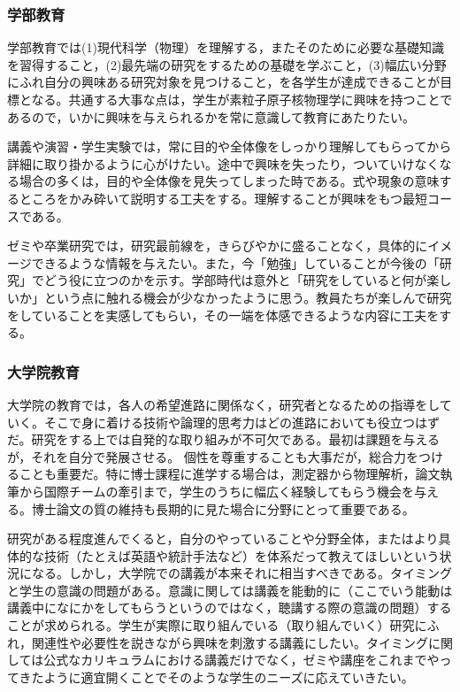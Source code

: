 \subsubsection{学部教育}
学部教育では(1)現代科学（物理）を理解する，またそのために必要な基礎知識を習得すること，(2)最先端の研究をするための基礎を学ぶこと，(3)幅広い分野にふれ自分の興味ある研究対象を見つけること，を各学生が達成できることが目標となる。共通する大事な点は，学生が素粒子原子核物理学に興味を持つことであるので，いかに興味を与えられるかを常に意識して教育にあたりたい。

講義や演習・学生実験では，常に目的や全体像をしっかり理解してもらってから詳細に取り掛かるように心がけたい。途中で興味を失ったり，ついていけなくなる場合の多くは，目的や全体像を見失ってしまった時である。式や現象の意味するところをかみ砕いて説明する工夫をする。理解することが興味をもつ最短コースである。

ゼミや卒業研究では，研究最前線を，きらびやかに盛ることなく，具体的にイメージできるような情報を与えたい。また，今「勉強」していることが今後の「研究」でどう役に立つのかを示す。学部時代は意外と「研究をしていると何が楽しいか」という点に触れる機会が少なかったように思う。教員たちが楽しんで研究をしていることを実感してもらい，その一端を体感できるような内容に工夫をする。

\subsubsection{大学院教育}

大学院の教育では，各人の希望進路に関係なく，研究者となるための指導をしていく。そこで身に着ける技術や論理的思考力はどの進路においても役立つはずだ。研究をする上では自発的な取り組みが不可欠である。最初は課題を与えるが，それを自分で発展させる。
個性を尊重することも大事だが，総合力をつけることも重要だ。特に博士課程に進学する場合は，測定器から物理解析，論文執筆から国際チームの牽引まで，学生のうちに幅広く経験してもらう機会を与える。博士論文の質の維持も長期的に見た場合に分野にとって重要である。

研究がある程度進んでくると，自分のやっていることや分野全体，またはより具体的な技術（たとえば英語や統計手法など）を体系だって教えてほしいという状況になる。しかし，大学院での講義が本来それに相当すべきである。タイミングと学生の意識の問題がある。意識に関しては講義を能動的に（ここでいう能動は講義中になにかをしてもらうというのではなく，聴講する際の意識の問題）することが求められる。学生が実際に取り組んでいる（取り組んでいく）研究にふれ，関連性や必要性を説きながら興味を刺激する講義にしたい。タイミングに関しては公式なカリキュラムにおける講義だけでなく，ゼミや講座をこれまでやってきたように適宜開くことでそのような学生のニーズに応えていきたい。


